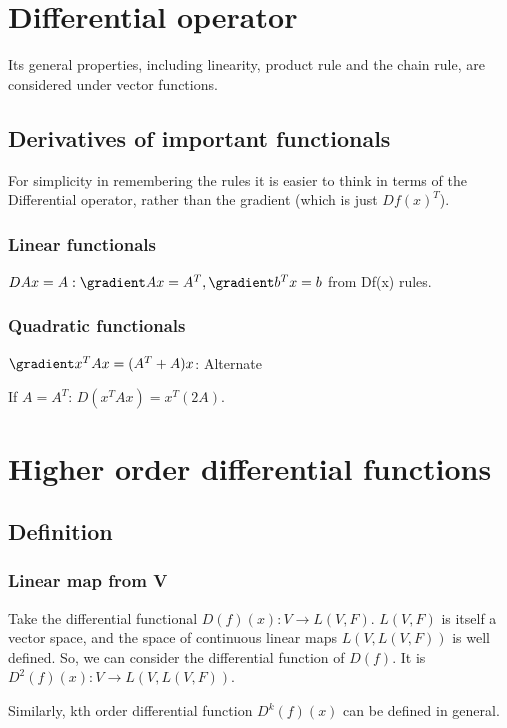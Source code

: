 \documentclass[oneside, article]{memoir}
\begin{document}
\section{Differential operator}
Its general properties, including linearity, product rule and the chain rule, are considered under vector functions.

\subsection{Derivatives of important functionals}
For simplicity in remembering the rules it is easier to think in terms of the Differential operator, rather than the gradient (which is just $Df(x)^{T}$).

\subsubsection{Linear functionals}
$DAx = A : \gradient Ax = A^{T}, \gradient b^{T}x = b$ from Df(x) rules.

\subsubsection{Quadratic functionals}
$\gradient x^{T}Ax = (A^{T} + A )x$:  Alternate 

If $A = A^{T}$: $D(x^{T}Ax) = x^{T}(2A)$.

\section{Higher order differential functions}
\subsection{Definition}
\subsubsection{Linear map from V}
Take the differential functional $D(f)(x):V \to L(V, F)$. $L(V, F)$ is itself a vector space, and the space of continuous linear maps $L(V, L(V, F))$ is well defined. So, we can consider the differential function of $D(f)$. It is $D^2(f)(x): V \to L(V, L(V, F))$.

Similarly, kth order differential function $D^{k}(f)(x)$ can be defined in general.
\end{document}
